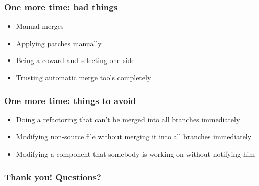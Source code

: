 \documentclass{beamer}
\begin{document}
\begin{frame}
\frametitle{One more time: bad things}
\begin{itemize}
\item Manual merges
\item Applying patches manually
\item Being a coward and selecting one side
\item Trusting automatic merge tools completely
\end{itemize}
\end{frame}

\begin{frame}
\frametitle{One more time: things to avoid}
\begin{itemize}
\item Doing a refactoring that can't be merged into all branches immediately
\item Modifying non-source file without merging it into all branches immediately
\item Modifying a component that somebody is working on without notifying him 
\end{itemize}
\end{frame}


\begin{frame}
\frametitle{Thank you! Questions?}
\begin{center}
\end{center}
\end{frame}
\end{document}
